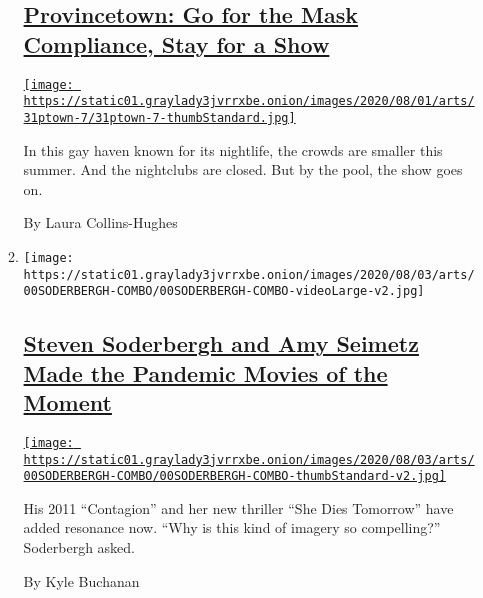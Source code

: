 \begin{enumerate}
\begin{enumerate}
    \hypertarget{provincetown-go-for-the-mask-compliance-stay-for-a-show}{%
    \subsection{\texorpdfstring{\href{/2020/07/31/theater/provincetown-nightlife-coronavirus.html}{Provincetown:
    Go for the Mask Compliance, Stay for a
    Show}}{Provincetown: Go for the Mask Compliance, Stay for a Show}}\label{provincetown-go-for-the-mask-compliance-stay-for-a-show}}

    \href{/2020/07/31/theater/provincetown-nightlife-coronavirus.html}{\texttt{[image: https://static01.graylady3jvrrxbe.onion/images/2020/08/01/arts/31ptown-7/31ptown-7-thumbStandard.jpg]}}

    In this gay haven known for its nightlife, the crowds are smaller
    this summer. And the nightclubs are closed. But by the pool, the
    show goes on.

    By Laura Collins-Hughes
  \item
    \texttt{[image: https://static01.graylady3jvrrxbe.onion/images/2020/08/03/arts/00SODERBERGH-COMBO/00SODERBERGH-COMBO-videoLarge-v2.jpg]}

    \hypertarget{steven-soderbergh-and-amy-seimetz-made-the-pandemic-movies-of-the-moment}{%
    \subsection{\texorpdfstring{\href{/2020/07/31/movies/steven-soderbergh-amy-seimetz-pandemic.html}{Steven
    Soderbergh and Amy Seimetz Made the Pandemic Movies of the
    Moment}}{Steven Soderbergh and Amy Seimetz Made the Pandemic Movies of the Moment}}\label{steven-soderbergh-and-amy-seimetz-made-the-pandemic-movies-of-the-moment}}

    \href{/2020/07/31/movies/steven-soderbergh-amy-seimetz-pandemic.html}{\texttt{[image: https://static01.graylady3jvrrxbe.onion/images/2020/08/03/arts/00SODERBERGH-COMBO/00SODERBERGH-COMBO-thumbStandard-v2.jpg]}}

    His 2011 ``Contagion'' and her new thriller ``She Dies Tomorrow''
    have added resonance now. ``Why is this kind of imagery so
    compelling?'' Soderbergh asked.

    By Kyle Buchanan
  \end{enumerate}
\end{enumerate}

